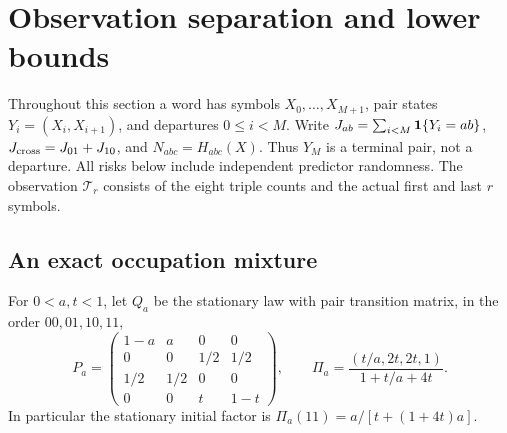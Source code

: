 \section{Observation separation and lower bounds}
\label{sec:negative-proofs}

Throughout this section a word has symbols $X_0,\ldots,X_{M+1}$,
pair states $Y_i=(X_i,X_{i+1})$, and departures $0\le i<M$.
Write $J_{ab}=\sum_{i<M}\mathbf 1\{Y_i=ab\}$,
$J_{\rm cross}=J_{01}+J_{10}$, and $N_{abc}=H_{abc}(X)$.
Thus $Y_M$ is a terminal pair, not a departure. All risks below include
independent predictor randomness. The observation $\mathcal T_r$ consists
of the eight triple counts and the actual first and last $r$ symbols.

\subsection{An exact occupation mixture}

For $0<a,t<1$, let $Q_a$ be the stationary law with pair transition matrix,
in the order $00,01,10,11$,
\[
 P_a=\begin{pmatrix}
 1-a&a&0&0\\
 0&0&1/2&1/2\\
 1/2&1/2&0&0\\
 0&0&t&1-t
 \end{pmatrix},\qquad
 \Pi_a=\frac{(t/a,2t,2t,1)}{1+t/a+4t}.
\]
In particular the stationary initial factor is
$\Pi_a(11)=a/[t+(1+4t)a]$.

